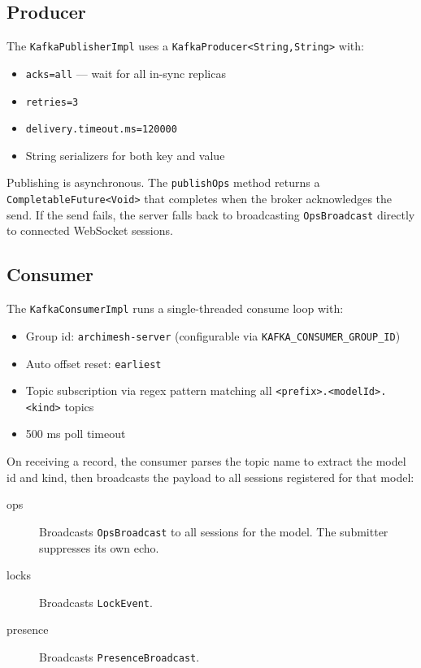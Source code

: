 \subsection{Producer}

The \texttt{KafkaPublisherImpl} uses a \texttt{KafkaProducer<String,{}String>}
with:

\begin{itemize}
\item \texttt{acks=all} --- wait for all in-sync replicas
\item \texttt{retries=3}
\item \texttt{delivery.timeout.ms=120000}
\item String serializers for both key and value
\end{itemize}

Publishing is asynchronous. The \texttt{publishOps} method returns a
\texttt{CompletableFuture<Void>} that completes when the broker acknowledges
the send. If the send fails, the server falls back to broadcasting
\texttt{OpsBroadcast} directly to connected WebSocket sessions.

\subsection{Consumer}

The \texttt{KafkaConsumerImpl} runs a single-threaded consume loop with:

\begin{itemize}
\item Group id: \texttt{archimesh-server} (configurable via
  \texttt{KAFKA\_CONSUMER\_GROUP\_ID})
\item Auto offset reset: \texttt{earliest}
\item Topic subscription via regex pattern matching all
  \texttt{<prefix>.<modelId>.<kind>} topics
\item 500 ms poll timeout
\end{itemize}

On receiving a record, the consumer parses the topic name to extract the
model id and kind, then broadcasts the payload to all sessions registered
for that model:

\begin{description}
\item[ops] Broadcasts \texttt{OpsBroadcast} to all sessions for the model.
  The submitter suppresses its own echo.
\item[locks] Broadcasts \texttt{LockEvent}.
\item[presence] Broadcasts \texttt{PresenceBroadcast}.
\end{description}

